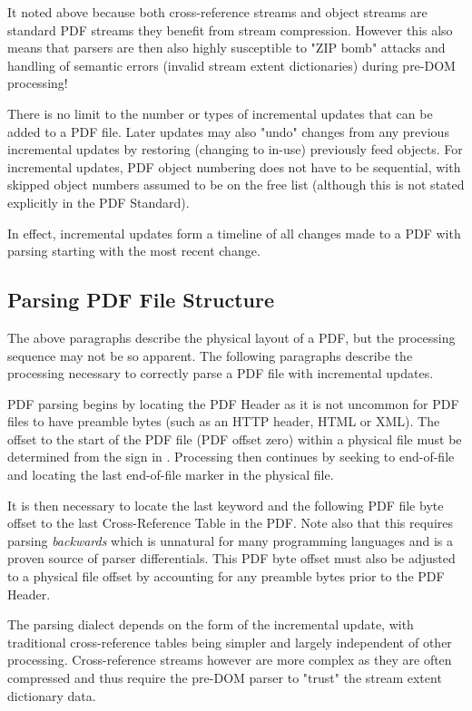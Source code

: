 It noted above because both cross-reference streams and object streams are standard PDF streams they 
benefit from stream compression. However this also means that parsers are then also highly 
susceptible to "ZIP bomb" attacks and handling of semantic errors (invalid stream extent dictionaries) during pre-DOM processing!

There is no limit to the number or types of incremental updates that can be added to a PDF file. Later
updates may also "undo" changes from any previous incremental updates by restoring (changing to in-use)
previously feed objects. For incremental updates, PDF object numbering 
does not have to be sequential, with skipped object numbers assumed to be on
the free list (although this is not stated explicitly in the PDF Standard).

In effect, incremental updates form a timeline of all changes made to a PDF with parsing starting
with the most recent change.

\subsection{Parsing PDF File Structure}

The above paragraphs describe the physical layout of a PDF, but the processing sequence may not be so apparent. The following paragraphs describe the processing necessary to correctly parse a PDF file with incremental updates.

PDF parsing begins by locating the PDF Header as it is not uncommon for PDF files to have 
preamble bytes (such as an HTTP header, HTML or XML). The offset to the start of the PDF file 
(PDF offset zero)
within a physical file must be determined from the \lstcd{\%} sign in . 
Processing then continues by seeking to end-of-file and locating the last end-of-file marker  in the physical file.

It is then necessary to locate the last  keyword and the following PDF file byte offset 
to the last Cross-Reference Table in the PDF. Note also that this requires parsing \emph{backwards}
which is unnatural for many programming languages and is a proven source of parser differentials. This PDF byte offset must also be adjusted to a physical file offset by accounting for any preamble bytes prior to the PDF Header.

The parsing dialect depends on the form of the incremental update, with
traditional cross-reference tables being simpler and largely independent of
other processing. Cross-reference streams however are more complex as they are
often compressed and thus require the pre-DOM parser to "trust" the stream
extent dictionary data.

